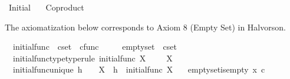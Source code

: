 %
\begin{isabellebody}%
%
%
\isadelimtheory
%
\endisadelimtheory
%
\isatagtheory
{}\isamarkupfalse%
\ Initial\isanewline
\ \ \ Coproduct\isanewline
{}%
\endisatagtheory
{\isafoldtheory}%
%
\isadelimtheory
%
\endisadelimtheory
%
\isadelimdocument
%
\endisadelimdocument
%
\isatagdocument
%
\isamarkuptrue%
%
\endisatagdocument
{\isafolddocument}%
%
\isadelimdocument
%
\endisadelimdocument
%
\begin{isamarkuptext}%
The axiomatization below corresponds to Axiom 8 (Empty Set) in Halvorson.%
\end{isamarkuptext}\isamarkuptrue%
\isamarkupfalse%
\isanewline
\ \ initial{\isacharunderscore}{\kern0pt}func\ {\isacharcolon}{\kern0pt}{\isacharcolon}{\kern0pt}\ {\isachardoublequoteopen}cset\ {\isasymRightarrow}\ cfunc{\isachardoublequoteclose}\ {\isacharparenleft}{\kern0pt}{\isachardoublequoteopen}{\isasymalpha}\isactrlbsub {\isacharunderscore}{\kern0pt}\isactrlesub {\isachardoublequoteclose}\ {}{}{}{\isacharparenright}{\kern0pt}\ \isanewline
\ \ emptyset\ {\isacharcolon}{\kern0pt}{\isacharcolon}{\kern0pt}\ {\isachardoublequoteopen}cset{\isachardoublequoteclose}\ {\isacharparenleft}{\kern0pt}{\isachardoublequoteopen}{\isasymemptyset}{\isachardoublequoteclose}{\isacharparenright}{\kern0pt}\isanewline
{}\isanewline
\ \ initial{\isacharunderscore}{\kern0pt}func{\isacharunderscore}{\kern0pt}type{\isacharbrackleft}{\kern0pt}type{\isacharunderscore}{\kern0pt}rule{\isacharbrackright}{\kern0pt}{\isacharcolon}{\kern0pt}\ {\isachardoublequoteopen}initial{\isacharunderscore}{\kern0pt}func\ X\ {\isacharcolon}{\kern0pt}\ \ {\isasymemptyset}\ {\isasymrightarrow}\ X{\isachardoublequoteclose}\ \isanewline
\ \ initial{\isacharunderscore}{\kern0pt}func{\isacharunderscore}{\kern0pt}unique{\isacharcolon}{\kern0pt}\ {\isachardoublequoteopen}h\ {\isacharcolon}{\kern0pt}\ {\isasymemptyset}\ {\isasymrightarrow}\ X\ {\isasymLongrightarrow}\ h\ {\isacharequal}{\kern0pt}\ initial{\isacharunderscore}{\kern0pt}func\ X{\isachardoublequoteclose}\ \isanewline
\ \ emptyset{\isacharunderscore}{\kern0pt}is{\isacharunderscore}{\kern0pt}empty{\isacharcolon}{\kern0pt}\ {\isachardoublequoteopen}{\isasymnot}{\isacharparenleft}{\kern0pt}x\ {\isasymin}\isactrlsub c\ {\isasymemptyset}{\isacharparenright}{\kern0pt}{\isachardoublequoteclose}\isanewline

\end{isabellebody}
